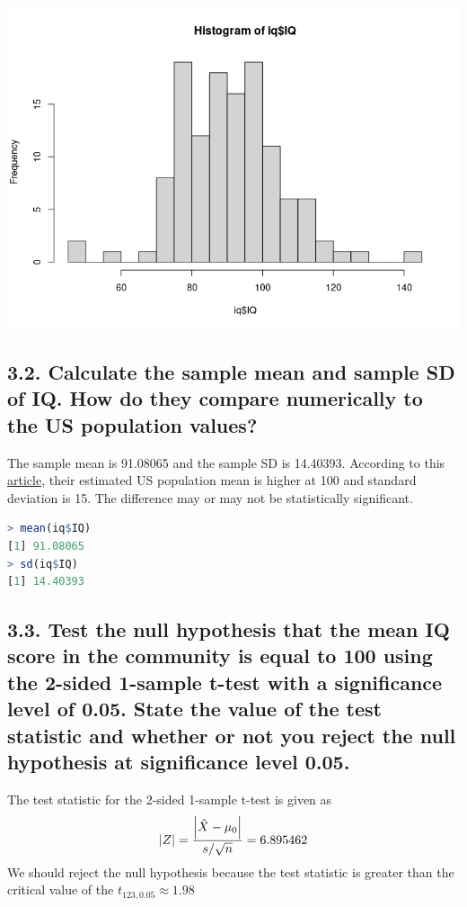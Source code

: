 \documentclass[11pt]{article}
\begin{document}
\includegraphics[width=150mm]{Rplot01.png}

\subsection*{3.2. Calculate the sample mean and sample SD of IQ. How do they compare numerically to the US population values?}
The sample mean is 91.08065 and the sample SD is 14.40393. According to this \href{https://www.ncbi.nlm.nih.gov/pmc/articles/PMC4603674/}{article}, their estimated US population mean is higher at 100 and standard deviation is 15. The difference may or may not be statistically significant.
\begin{lstlisting}[language=R]
> mean(iq$IQ)
[1] 91.08065
> sd(iq$IQ)
[1] 14.40393
\end{lstlisting}

\subsection*{3.3. Test the null hypothesis that the mean IQ score in the community is equal to 100 using the 2-sided 1-sample t-test with a significance level of 0.05. State the value of the test statistic and whether or not you reject the null hypothesis at significance level 0.05.}
The test statistic for the 2-sided 1-sample t-test is given as
\begin{equation*}
\abs{Z} = \frac{\abs{\hat{X} - \mu_0}}{s/\sqrt{n}} = 6.895462    
\end{equation*}
We should reject the null hypothesis because the test statistic is greater than the critical value of the $t_{123,0.05} \approx 1.98$ 
\end{document}
